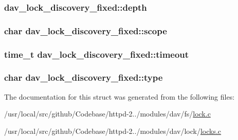 \subsubsection[{\texorpdfstring{depth}{depth}}]{ dav\+\_\+lock\+\_\+discovery\+\_\+fixed\+::depth}\hypertarget{structdav__lock__discovery__fixed_adc6116b74f4c03f2d2153c4fb63eaa55}{}\label{structdav__lock__discovery__fixed_adc6116b74f4c03f2d2153c4fb63eaa55}
\subsubsection[{\texorpdfstring{scope}{scope}}]{\setlength{\rightskip}{0pt plus 5cm}char dav\+\_\+lock\+\_\+discovery\+\_\+fixed\+::scope}\hypertarget{structdav__lock__discovery__fixed_a8c785ca0e2841243811d9fabbde3dba8}{}\label{structdav__lock__discovery__fixed_a8c785ca0e2841243811d9fabbde3dba8}
\subsubsection[{\texorpdfstring{timeout}{timeout}}]{\setlength{\rightskip}{0pt plus 5cm}time\+\_\+t dav\+\_\+lock\+\_\+discovery\+\_\+fixed\+::timeout}\hypertarget{structdav__lock__discovery__fixed_a6f25c172ac197fc220caead330a10691}{}\label{structdav__lock__discovery__fixed_a6f25c172ac197fc220caead330a10691}
\subsubsection[{\texorpdfstring{type}{type}}]{\setlength{\rightskip}{0pt plus 5cm}char dav\+\_\+lock\+\_\+discovery\+\_\+fixed\+::type}\hypertarget{structdav__lock__discovery__fixed_a969c3ad0b69664b66fefb74a40b1c1bd}{}\label{structdav__lock__discovery__fixed_a969c3ad0b69664b66fefb74a40b1c1bd}


The documentation for this struct was generated from the following files\+:\begin{DoxyCompactItemize}
\item 
/usr/local/src/github/\+Codebase/httpd-\/2../modules/dav/fs/\hyperlink{lock_8c}{lock.\+c}\item 
/usr/local/src/github/\+Codebase/httpd-\/2../modules/dav/lock/\hyperlink{locks_8c}{locks.\+c}\end{DoxyCompactItemize}
